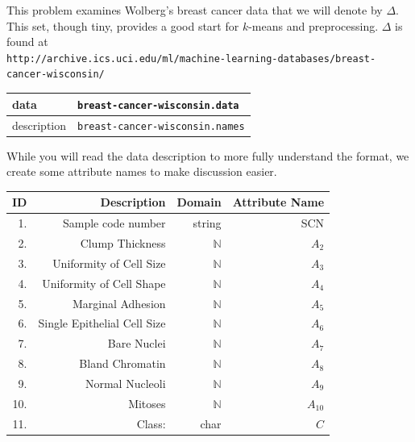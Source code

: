 \documentclass{article}
\begin{document}
 This problem examines Wolberg's breast cancer data\cite{WMbreast90} that we will denote by $\Delta$. This set, though tiny, provides a good start for $k$-means and preprocessing. $\Delta$ is found at\\
  {\texttt {http://archive.ics.uci.edu/ml/machine-learning-databases/breast-cancer-wisconsin/}}\\
  
  \begin{tabular}[h]{l||l}
data & {\texttt{breast-cancer-wisconsin.data}}\\ \hline 
description &  {\texttt{breast-cancer-wisconsin.names}}  
\end{tabular}

While you will read the data description to more fully understand the format, we create some attribute names to make discussion easier.


\begin{center}
\begin{tabular}[h]{rrrr}
\textsf{ID} & \textsf{Description} & \textsf{Domain} & \textsf{Attribute Name} \\ \hline \hline
 1. & Sample code number        &    string & SCN \\ 
   2.& Clump Thickness             &  $\mathbb{N}$ & $A_2$ \\
   3.& Uniformity of Cell Size     &  $\mathbb{N}$ & $A_3$\\
   4.& Uniformity of Cell Shape  &   $\mathbb{N}$ & $A_4$\\
   5.& Marginal Adhesion           &  $\mathbb{N}$ & $A_5$\\
   6.& Single Epithelial Cell Size  & $\mathbb{N}$ & $A_6$\\
   7.& Bare Nuclei                  & $\mathbb{N}$ & $A_7$\\
   8.& Bland Chromatin          &     $\mathbb{N}$ & $A_8$\\
   9.& Normal Nucleoli           &    $\mathbb{N}$ & $A_9$\\
  10.& Mitoses                       & $\mathbb{N}$ & $A_{10}$\\
  11.& Class:                       & char &  $C$ \\ \hline 
  \end{tabular}
\end{center}
\end{document}
